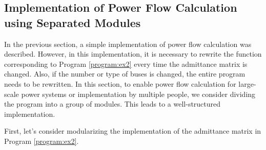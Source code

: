 \documentclass[graybox, envcountchap]{svmult}
\begin{document}
\subsection{Implementation of Power Flow Calculation using Separated Modules}

In the previous section, a simple implementation of power flow calculation was
described. However, in this implementation, it is necessary to rewrite the
function corresponding to Program \ref{program:ex2} every time the admittance
matrix is changed. Also, if the number or type of buses is changed, the entire
program needs to be rewritten. In this section, to enable power flow calculation
for large-scale power systems or implementation by multiple people, we consider
dividing the program into a group of modules. This leads to a well-structured
implementation.

First, let's consider modularizing the implementation of the admittance matrix
in Program \ref{program:ex2}.
\end{document}
